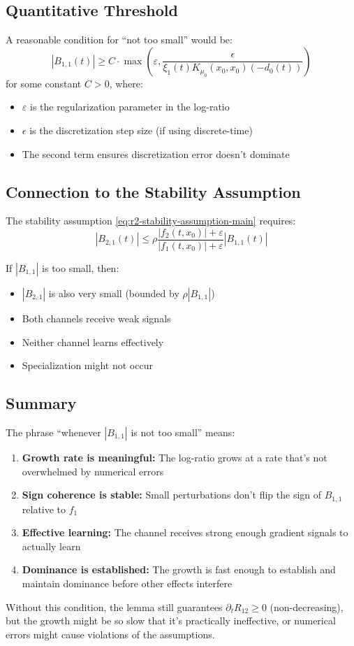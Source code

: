 \subsection{Quantitative Threshold}

A reasonable condition for ``not too small'' would be:
\[
|B_{1,1}(t)| \ge C \cdot \max\left(\varepsilon, \frac{\epsilon}{\xi_1(t) K_{\mu_0}(x_0,x_0) (-d_0(t))}\right)
\]
for some constant $C > 0$, where:
\begin{itemize}
\item $\varepsilon$ is the regularization parameter in the log-ratio
\item $\epsilon$ is the discretization step size (if using discrete-time)
\item The second term ensures discretization error doesn't dominate
\end{itemize}

\subsection{Connection to the Stability Assumption}

The stability assumption \eqref{eq:r2-stability-assumption-main} requires:
\[
|B_{2,1}(t)| \le \rho \frac{|f_2(t,x_0)|+\varepsilon}{|f_1(t,x_0)|+\varepsilon} |B_{1,1}(t)|
\]

If $|B_{1,1}|$ is too small, then:
\begin{itemize}
\item $|B_{2,1}|$ is also very small (bounded by $\rho |B_{1,1}|$)
\item Both channels receive weak signals
\item Neither channel learns effectively
\item Specialization might not occur
\end{itemize}

\subsection{Summary}

The phrase ``whenever $|B_{1,1}|$ is not too small'' means:
\begin{enumerate}
\item \textbf{Growth rate is meaningful:} The log-ratio grows at a rate that's not overwhelmed by numerical errors
\item \textbf{Sign coherence is stable:} Small perturbations don't flip the sign of $B_{1,1}$ relative to $f_1$
\item \textbf{Effective learning:} The channel receives strong enough gradient signals to actually learn
\item \textbf{Dominance is established:} The growth is fast enough to establish and maintain dominance before other effects interfere
\end{enumerate}

Without this condition, the lemma still guarantees $\partial_t R_{12} \ge 0$ (non-decreasing), but the growth might be so slow that it's practically ineffective, or numerical errors might cause violations of the assumptions.
